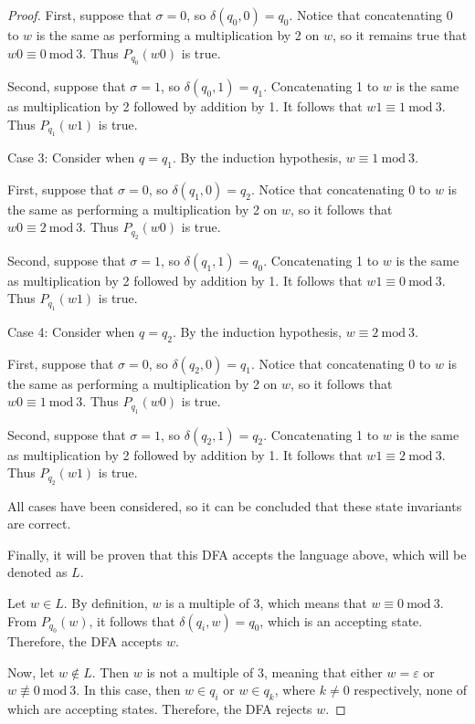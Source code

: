 \documentclass[11pt]{article}
\begin{document}
\begin{enumerate}[label=\textbf{Q\arabic*.}]
\begin{enumerate}[label=\textit{\alph*)}]
\begin{proof}
		First, suppose that \(\sigma = 0\), so \(\delta (q_0, 0) = q_0\). Notice that concatenating 0 to \(w\) is the same as performing a multiplication by 2 on \(w\), so it remains true that \(w0 \equiv 0\ \mathrm{mod} \ 3\). Thus \(P_{q_0}(w0)\) is true.

		Second, suppose that \(\sigma = 1\), so \(\delta (q_0, 1) = q_1\). Concatenating 1 to \(w\) is the same as multiplication by 2 followed by addition by 1. It follows that \(w1 \equiv 1\ \mathrm{mod} \ 3\). Thus \(P_{q_1}(w1)\) is true.

		Case 3: Consider when \(q = q_1\). By the induction hypothesis, \(w \equiv 1\ \mathrm{mod} \ 3\).

		First, suppose that \(\sigma = 0\), so \(\delta (q_1, 0) = q_2\). Notice that concatenating 0 to \(w\) is the same as performing a multiplication by 2 on \(w\), so it follows that \(w0 \equiv 2\ \mathrm{mod} \ 3\). Thus \(P_{q_2}(w0)\) is true.

		Second, suppose that \(\sigma = 1\), so \(\delta (q_1, 1) = q_0\). Concatenating 1 to \(w\) is the same as multiplication by 2 followed by addition by 1. It follows that \(w1 \equiv 0\ \mathrm{mod} \ 3\). Thus \(P_{q_1}(w1)\) is true.

		Case 4: Consider when \(q = q_2\). By the induction hypothesis, \(w \equiv 2\ \mathrm{mod} \ 3\).

		First, suppose that \(\sigma = 0\), so \(\delta (q_2, 0) = q_1\). Notice that concatenating 0 to \(w\) is the same as performing a multiplication by 2 on \(w\), so it follows that \(w0 \equiv 1\ \mathrm{mod} \ 3\). Thus \(P_{q_1}(w0)\) is true.

		Second, suppose that \(\sigma = 1\), so \(\delta (q_2, 1) = q_2\). Concatenating 1 to \(w\) is the same as multiplication by 2 followed by addition by 1. It follows that \(w1 \equiv 2\ \mathrm{mod} \ 3\). Thus \(P_{q_2}(w1)\) is true.

		All cases have been considered, so it can be concluded that these state invariants are correct.

		Finally, it will be proven that this DFA accepts the language above, which will be denoted as \(L\).

		Let \(w \in L\). By definition, \(w\) is a multiple of 3, which means that \(w \equiv 0\ \mathrm{mod} \ 3\). From \(P_{q_0}(w)\), it follows that \(\delta (q_i, w) = q_0\), which is an accepting state. Therefore, the DFA accepts \(w\).

		Now, let \(w \notin L\). Then \(w\) is not a multiple of 3, meaning that either \(w = \varepsilon\) or \(w \not\equiv 0\ \mathrm{mod} \ 3\). In this case, then \(w \in q_i\) or \(w \in q_k\), where \(k\neq 0\) respectively, none of which are accepting states. Therefore, the DFA rejects \(w\).


\end{proof}
\end{enumerate}
\end{enumerate}
\end{document}
